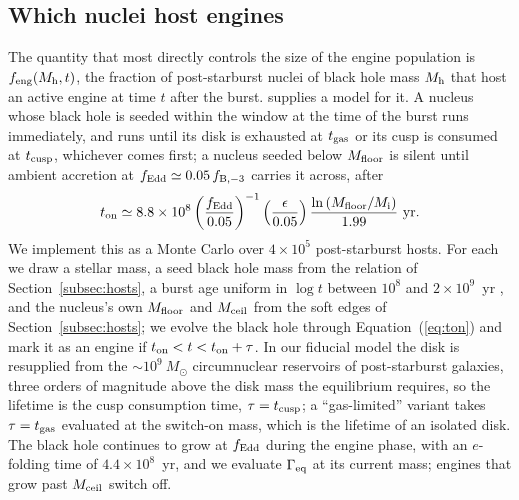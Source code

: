 \documentclass[twocolumn,pdftex]{aastex701}
\newcommand{\msun}{M_{\odot}\xspace}
\newcommand{\gameq}{\Gamma_{\rm eq}\xspace}
\begin{document}
\subsection{Which nuclei host engines}\label{subsec:occupation}

The quantity that most directly controls the size of the engine population is $f_{\rm eng}(M_{\rm h}, t)$, the fraction of post-starburst nuclei of black hole mass $M_{\rm h}$ that host an active engine at time $t$ after the burst. \citet{Guillochon:2026a} supplies a model for it. A nucleus whose black hole is seeded within the window at the time of the burst runs immediately, and runs until its disk is exhausted at $t_{\rm gas}$ or its cusp is consumed at $t_{\rm cusp}$, whichever comes first; a nucleus seeded below $M_{\rm floor}$ is silent until ambient accretion at $f_{\rm Edd} \simeq 0.05\, f_{\rm B,-3}$ carries it across, after
\begin{equation}
t_{\rm on} \simeq 8.8 \times 10^{8}
\left(\frac{f_{\rm Edd}}{0.05}\right)^{-1}
\left(\frac{\epsilon}{0.05}\right)
\frac{\ln\left(M_{\rm floor}/M_{\rm i}\right)}{1.99}~{\rm yr}.
\label{eq:ton}
\end{equation}
We implement this as a Monte Carlo over $4 \times 10^{5}$ post-starburst hosts. For each we draw a stellar mass, a seed black hole mass from the relation of Section~\ref{subsec:hosts}, a burst age uniform in $\log t$ between $10^{8}$ and $2 \times 10^{9}$~yr \citep{French:2018a}, and the nucleus's own $M_{\rm floor}$ and $M_{\rm ceil}$ from the soft edges of Section~\ref{subsec:hosts}; we evolve the black hole through Equation~(\ref{eq:ton}) and mark it as an engine if $t_{\rm on} < t < t_{\rm on} + \tau$. In our fiducial model the disk is resupplied from the $\sim 10^{9}~\msun$ circumnuclear reservoirs of post-starburst galaxies, three orders of magnitude above the disk mass the equilibrium requires, so the lifetime is the cusp consumption time, $\tau = t_{\rm cusp}$; a ``gas-limited'' variant takes $\tau = t_{\rm gas}$ evaluated at the switch-on mass, which is the lifetime of an isolated disk. The black hole continues to grow at $f_{\rm Edd}$ during the engine phase, with an $e$-folding time of $4.4 \times 10^{8}$~yr, and we evaluate $\gameq$ at its current mass; engines that grow past $M_{\rm ceil}$ switch off.
\end{document}
